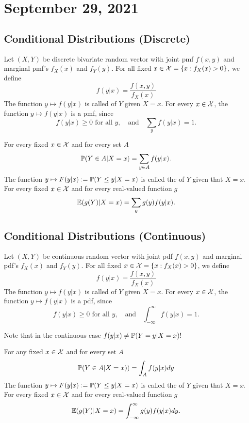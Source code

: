 \section{September 29, 2021}
\subsection{Conditional Distributions (Discrete)}
Let $(X,Y)$ be discrete bivariate random vector with joint pmf $f(x,y)$ and marginal pmf's $f_X(x)$ and $f_Y(y)$. For all fixed $x \in \mathcal X = 
\{
x:f_X(x) > 0
\}$, we define
$$
f(y|x) = \frac{f(x,y)}{f_X(x)}
$$
The function $y \mapsto f(y|x)$ is called  of $Y$ given $X=x$.
For every $x \in \mathcal X$, the function $y \mapsto f(y|x)$ is a pmf, since
$$
f(y|x) \geq 0 \text{ for all } y, \quad \text{and} \quad \sum_{y}f(y|x) =1.
$$

\begin{note}
    For every fixed $x \in \mathcal X$ and for every set $A$
    $$
    \mathbb P(Y \in A|X=x) = \sum_{y \in A}f(y|x). 
    $$
    The function $y \mapsto F(y|x):= \mathbb P(Y \leq y|X=x)$ is called the  of $Y$ given that $X=x$.
    \\
     For every fixed $x \in \mathcal X$ and for every real-valued function $g$
    $$
    \mathbb E (g(Y)|X=x) = \sum_y g(y)f(y|x).
    $$
\end{note}
\subsection{Conditional Distributions (Continuous)}
Let $(X,Y)$ be continuous random vector with joint pdf $f(x,y)$ and marginal pdf's $f_X(x)$ and $f_Y(y)$. For all fixed $x \in \mathcal X = 
\{
x:f_X(x) > 0
\}$, we define
$$
f(y|x) = \frac{f(x,y)}{f_X(x)}
$$
The function $y \mapsto f(y|x)$ is called  of $Y$ given $X=x$.
For every $x \in \mathcal X$, the function $y \mapsto f(y|x)$ is a pdf, since
$$
f(y|x) \geq 0 \text{ for all } y, \quad \text{and} \quad \int_{-\infty}^{\infty}f(y|x) =1.
$$
\begin{moral}
    Note that in the continuous case $f(y|x) \neq \mathbb P(Y=y|X=x)!$
\end{moral}

\begin{note}
     For any fixed $x \in \mathcal X$ and for every set $A$
    $$
    \mathbb P(Y \in A |X=x)) = \int_{A}f(y|x)dy
    $$
    The function $y \mapsto F(y|x):= \mathbb P(Y \leq y|X=x)$ is called the  of $Y$ given that $X=x$.    
    \\
     For every fixed $x \in \mathcal X$ and for every real-valued function $g$
    $$
    \mathbb E (g(Y)|X=x) = \int_{- \infty}^{\infty} g(y)f(y|x) dy.
    $$
\end{note}

